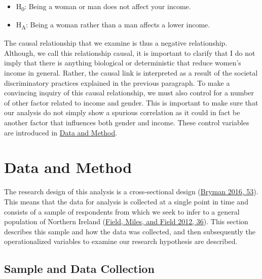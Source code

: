 \documentclass[
]{article}
\providecommand{\tightlist}{%
  \setlength{\itemsep}{0pt}\setlength{\parskip}{0pt}}
\begin{document}
\begin{itemize}
\tightlist
\item
  H\textsubscript{0}: Being a woman or man does not affect your income.
\item
  H\textsubscript{A}: Being a woman rather than a man affects a lower
  income.
\end{itemize}

The causal relationship that we examine is thus a negative relationship.
Although, we call this relationship causal, it is important to clarify
that I do not imply that there is anything biological or deterministic
that reduce women's income in general. Rather, the causal link is
interpreted as a result of the societal discriminatory practices
explained in the previous paragraph. To make a convincing inquiry of
this causal relationship, we must also control for a number of other
factor related to income and gender. This is important to make sure that
our analysis do not simply show a spurious correlation as it could in
fact be another factor that influences both gender and income. These
control variables are introduced in
\protect\hyperlink{data-and-method}{Data and Method}.

\hypertarget{data-and-method}{%
\section{Data and Method}\label{data-and-method}}

The research design of this analysis is a cross-sectional design
(\protect\hyperlink{ref-bryman2016social}{Bryman 2016, 53}). This means
that the data for analysis is collected at a single point in time and
consists of a sample of respondents from which we seek to infer to a
general population of Northern Ireland
(\protect\hyperlink{ref-field2012discovering}{Field, Miles, and Field
2012, 36}). This section describes this sample and how the data was
collected, and then subsequently the operationalized variables to
examine our research hypothesis are described.

\hypertarget{sample-and-data-collection}{%
\subsection{Sample and Data
Collection}\label{sample-and-data-collection}}
\end{document}
